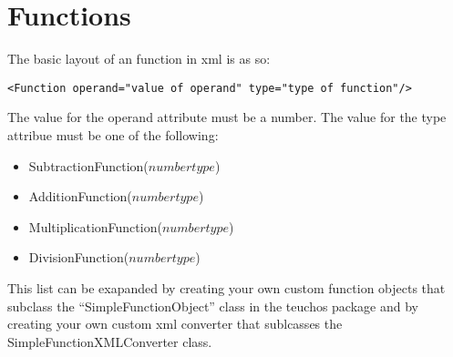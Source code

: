 \section{Functions}
\label{sec:funcs}
The basic layout of an function in xml is as so:
\begin{Verbatim}[frame=single]
<Function operand="value of operand" type="type of function"/>
\end{Verbatim}
The value for the operand attribute must be a number. The value for the type attribue must be
one of the following:
\begin{itemize}
\item SubtractionFunction($number type$)
\item AdditionFunction($number type$)
\item MultiplicationFunction($number type$)
\item DivisionFunction($number type$)
\end{itemize}
This list can be exapanded by creating your own custom function objects that subclass the 
``SimpleFunctionObject'' class in the teuchos package and by creating your own custom
xml converter that sublcasses the SimpleFunctionXMLConverter class.


